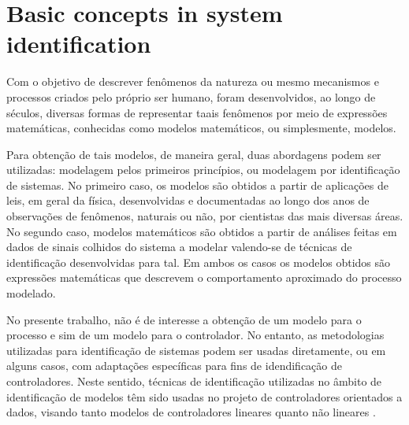 
\chapter{Basic concepts in system identification}
\label{cap:cap2} \vspace{-1cm}

%
Com o objetivo de descrever fenômenos da natureza ou mesmo mecanismos e processos criados pelo próprio ser humano, foram desenvolvidos, ao longo de séculos, diversas formas de representar taais fenômenos por meio de expressões matemáticas, conhecidas como modelos matemáticos, ou simplesmente, modelos. 

Para obtenção de tais modelos, de maneira geral, duas abordagens podem ser utilizadas: modelagem pelos primeiros princípios, ou modelagem por identificação de sistemas. No primeiro caso, os modelos são obtidos a partir de aplicações de leis, em geral da física, desenvolvidas e documentadas ao longo dos anos de observações de fenômenos, naturais ou não, por cientistas das mais diversas áreas. No segundo caso, modelos matemáticos são obtidos a partir de análises feitas em dados de sinais colhidos do sistema a modelar valendo-se de técnicas de identificação desenvolvidas para tal. Em ambos os casos os modelos obtidos são expressões matemáticas que descrevem o comportamento aproximado do processo modelado.

No presente trabalho, não é de interesse a obtenção de um modelo para o processo e sim de um modelo para o controlador. No entanto, as metodologias utilizadas  para identificação de sistemas podem ser usadas diretamente, ou  em alguns casos, com adaptações específicas para fins de idendificação de controladores. Neste sentido, técnicas de identificação utilizadas no âmbito de identificação de modelos têm sido usadas no projeto de controladores orientados a dados, visando tanto modelos de controladores lineares \citep{campi2002} quanto não lineares \citep{campi2006}.

